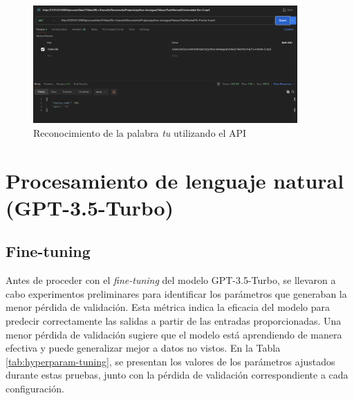 \begin{figure}[H]
    \centering
    \includegraphics[width=0.9\textwidth]{figuras/PruebaAPI2.png}
    \caption{Reconocimiento de la palabra \textit{tu} utilizando el API}
    \label{fig:APIRecognition2}
\end{figure}




\section{Procesamiento de lenguaje natural (GPT-3.5-Turbo)} 

\subsection{Fine-tuning}

Antes de proceder con el \textit{fine-tuning} del modelo GPT-3.5-Turbo, se llevaron a cabo experimentos preliminares para identificar los parámetros que generaban la menor pérdida de validación. Esta métrica indica la eficacia del modelo para predecir correctamente las salidas a partir de las entradas proporcionadas. Una menor pérdida de validación sugiere que el modelo está aprendiendo de manera efectiva y puede generalizar mejor a datos no vistos. En la Tabla \ref{tab:hyperparam-tuning}, se presentan los valores de los parámetros ajustados durante estas pruebas, junto con la pérdida de validación correspondiente a cada configuración.

